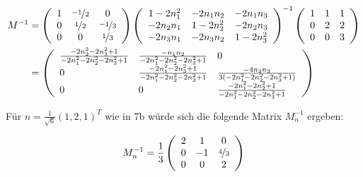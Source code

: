\documentclass[main.tex]{subfiles}
\begin{document}
\begin{align*}
    M^{-1} &= \eqmatrix{ccc}{
        1 & \nicefrac{-1}{2} & 0 \\
        0 & \nicefrac{1}{2} & \nicefrac{-1}{3} \\
        0 & 0 & \nicefrac{1}{3}
    } \eqmatrix{ccc}{
        1-2 n_1^2   & -2 n_1 n_2 & -2 n_1 n_3 \\
        -2 n_2 n_1 & 1-2 n_2^2   & -2 n_2 n_3 \\
        -2 n_3 n_1 & -2 n_3 n_2 & 1-2 n_3^2
    }^{-1} \eqmatrix{ccc}{
        1 & 1 & 1 \\
        0 & 2 & 2 \\
        0 & 0 & 3
    }\\
    &= \eqmatrix{lll}{
        \frac{-2 n_2^2 - 2 n_3^2 + 1}{-2 n_1^2 - 2 n_2^2 - 2 n_3^2 + 1} &               \frac{-n_1 n_2}{-2 n_1^2 - 2 n_2^2 - 2 n_3^2 + 1} & 0  \\
                                                                      0 & \frac{-2 n_1^2 - 2 n_3^2 + 1}{-2 n_1^2 - 2 n_2^2 - 2 n_3^2 + 1} & \frac{-4 n_2 n_3}{3 (-2 n_1^2 - 2 n_2^2 - 2 n_3^2 + 1)} \\
                                                                      0 &                                                           0 & \frac{-2 n_1^2 - 2 n_2^2 + 1}{-2 n_1^2 - 2 n_2^2 - 2 n_3^2 + 1} \\
    }
\end{align*}


Für $n = \frac{1}{\sqrt{6}} (1, 2, 1)^T$ wie in 7b würde sich die folgende Matrix $M_n^{-1}$ ergeben:

$$
    M_n^{-1} = \frac{1}{3} \eqmatrix{ccc}{
        2 & 1  & 0 \\
        0 & -1 & \nicefrac{4}{3} \\
        0 & 0  & 2 \\
    }
$$
\end{document}

